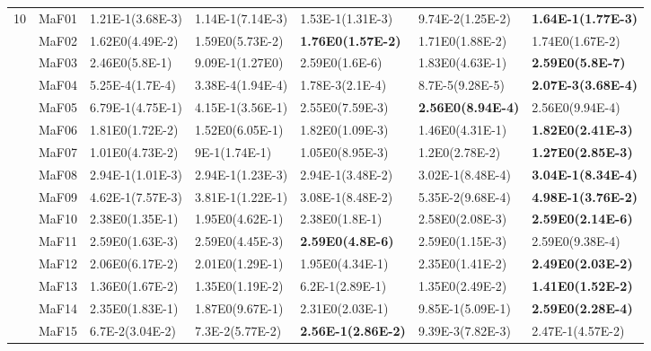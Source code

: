 \documentclass[]{article}
\begin{document}
\begin{landscape}
\begin{table}
\begin{footnotesize}
\begin{tabular}{|l|l|l|l|l|l|l|}
\multirow{15}{*}{10} & MaF01 & 1.21E-1(3.68E-3) & 1.14E-1(7.14E-3) & \cellcolor{gray95} 1.53E-1(1.31E-3) & 9.74E-2(1.25E-2) & \cellcolor{gray95} {\bf 1.64E-1(1.77E-3)}\\
 & MaF02 & 1.62E0(4.49E-2) & 1.59E0(5.73E-2) & \cellcolor{gray95} {\bf 1.76E0(1.57E-2)} & 1.71E0(1.88E-2) & \cellcolor{gray95} 1.74E0(1.67E-2)\\
 & MaF03 & \cellcolor{gray95} 2.46E0(5.8E-1) & 9.09E-1(1.27E0) & \cellcolor{gray95} 2.59E0(1.6E-6) & 1.83E0(4.63E-1) & \cellcolor{gray95} {\bf 2.59E0(5.8E-7)}\\
 & MaF04 & 5.25E-4(1.7E-4) & 3.38E-4(1.94E-4) & \cellcolor{gray95} 1.78E-3(2.1E-4) & 8.7E-5(9.28E-5) & \cellcolor{gray95} {\bf 2.07E-3(3.68E-4)}\\
 & MaF05 & 6.79E-1(4.75E-1) & 4.15E-1(3.56E-1) & 2.55E0(7.59E-3) & \cellcolor{gray95} {\bf 2.56E0(8.94E-4)} & \cellcolor{gray95} 2.56E0(9.94E-4)\\
 & MaF06 & 1.81E0(1.72E-2) & 1.52E0(6.05E-1) & \cellcolor{gray95} 1.82E0(1.09E-3) & 1.46E0(4.31E-1) & \cellcolor{gray95} {\bf 1.82E0(2.41E-3)}\\
 & MaF07 & 1.01E0(4.73E-2) & 9E-1(1.74E-1) & 1.05E0(8.95E-3) & \cellcolor{gray95} 1.2E0(2.78E-2) & \cellcolor{gray95} {\bf 1.27E0(2.85E-3)}\\
 & MaF08 & 2.94E-1(1.01E-3) & 2.94E-1(1.23E-3) & 2.94E-1(3.48E-2) & \cellcolor{gray95} 3.02E-1(8.48E-4) & \cellcolor{gray95} {\bf 3.04E-1(8.34E-4)}\\
 & MaF09 & \cellcolor{gray95} 4.62E-1(7.57E-3) & 3.81E-1(1.22E-1) & 3.08E-1(8.48E-2) & 5.35E-2(9.68E-4) & \cellcolor{gray95} {\bf 4.98E-1(3.76E-2)}\\
 & MaF10 & 2.38E0(1.35E-1) & 1.95E0(4.62E-1) & 2.38E0(1.8E-1) & 2.58E0(2.08E-3) & \cellcolor{gray95} {\bf 2.59E0(2.14E-6)}\\
 & MaF11 & 2.59E0(1.63E-3) & 2.59E0(4.45E-3) & \cellcolor{gray95} {\bf 2.59E0(4.8E-6)} & 2.59E0(1.15E-3) & \cellcolor{gray95} 2.59E0(9.38E-4)\\
 & MaF12 & 2.06E0(6.17E-2) & 2.01E0(1.29E-1) & 1.95E0(4.34E-1) & \cellcolor{gray95} 2.35E0(1.41E-2) & \cellcolor{gray95} {\bf 2.49E0(2.03E-2)}\\
 & MaF13 & 1.36E0(1.67E-2) & 1.35E0(1.19E-2) & 6.2E-1(2.89E-1) & 1.35E0(2.49E-2) & \cellcolor{gray95} {\bf 1.41E0(1.52E-2)}\\
 & MaF14 & 2.35E0(1.83E-1) & 1.87E0(9.67E-1) & 2.31E0(2.03E-1) & 9.85E-1(5.09E-1) & \cellcolor{gray95} {\bf 2.59E0(2.28E-4)}\\
 & MaF15 & 6.7E-2(3.04E-2) & 7.3E-2(5.77E-2) & \cellcolor{gray95} {\bf 2.56E-1(2.86E-2)} & 9.39E-3(7.82E-3) & \cellcolor{gray95} 2.47E-1(4.57E-2)\\
\hline


\end{tabular}
\end{footnotesize}
\end{table}
\end{landscape}
\end{document}

